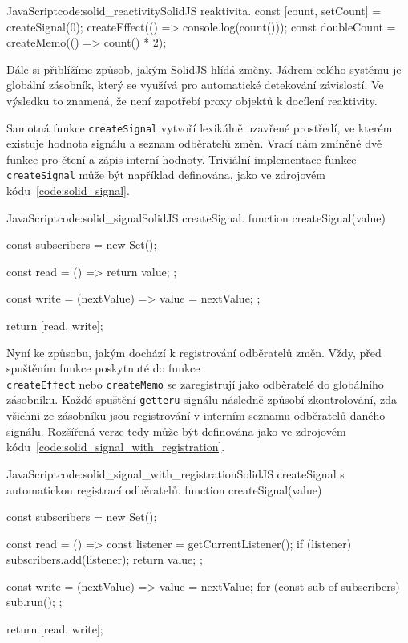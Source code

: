 \documentclass[
  master,
  program=ainf,
  tables=false,
  sourcecodes,
  glossaries,
  index
]{kidiplom}
\begin{document}
  \begin{kicode}{JavaScript}{code:solid_reactivity}{SolidJS reaktivita.}
    const [count, setCount] = createSignal(0);
    createEffect(() => console.log(count()));
    const doubleCount = createMemo(() => count() * 2);
  \end{kicode}

Dále si přiblížíme způsob, jakým SolidJS \cite{solidjs} hlídá změny. Jádrem celého systému je globální zásobník, který
se využívá pro automatické detekování závislostí. Ve výsledku to znamená, že není zapotřebí proxy objektů
k docílení reaktivity.

Samotná funkce {\tt createSignal} vytvoří lexikálně uzavřené prostředí, ve kterém existuje hodnota
signálu a seznam odběratelů změn. Vrací nám zmíněné dvě funkce pro čtení a zápis interní hodnoty.
Triviální implementace funkce {\tt createSignal} může být například definována, jako ve zdrojovém 
kódu~\ref{code:solid_signal}.

  \begin{kicode}{JavaScript}{code:solid_signal}{SolidJS createSignal.}
    function createSignal(value) {
      const subscribers = new Set();

      const read = () => {
        return value;
      };

      const write = (nextValue) => {
        value = nextValue;
      };

      return [read, write];
    }
  \end{kicode}

Nyní ke způsobu, jakým dochází k registrování odběratelů změn. Vždy, před spuštěním funkce poskytnuté do 
funkce \\{\tt createEffect} nebo {\tt createMemo} se zaregistrují jako odběratelé do globálního zásobníku. Každé spuštění
{\tt getteru} signálu následně způsobí zkontrolování, zda všichni ze zásobníku jsou registrování v interním seznamu
odběratelů daného signálu. Rozšířená verze tedy může být definována jako ve zdrojovém kódu~\ref{code:solid_signal_with_registration}.

\begin{absolutelynopagebreak}
  \begin{kicode}{JavaScript}{code:solid_signal_with_registration}{SolidJS createSignal s automatickou registrací odběratelů.}
    function createSignal(value) {
      const subscribers = new Set();

      const read = () => {
        const listener = getCurrentListener();
        if (listener) subscribers.add(listener);
        return value;
      };

      const write = (nextValue) => {
        value = nextValue;
        for (const sub of subscribers) sub.run();
      };

      return [read, write];
    }
\end{kicode}
\end{absolutelynopagebreak}
\end{document}
